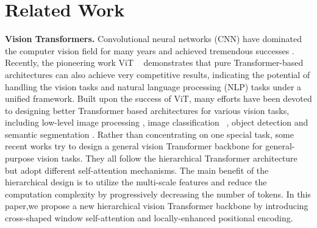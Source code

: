 \documentclass[10pt,twocolumn,letterpaper]{article}
\begin{document}
\section{Related Work}
\vspace{-1mm}
\noindent \textbf{Vision Transformers.} Convolutional neural networks (CNN) have dominated the computer vision field for many years and achieved tremendous successes \cite{krizhevsky2012imagenet, simonyan2014very, szegedy2015going,he2016deep,huang2017densely, chen2017dual, hu2018squeeze, tan2019efficientnet,howard2017mobilenets, sandler2018mobilenetv2, sun2019deep}. Recently, the pioneering work ViT ~\cite{dosovitskiy2020vit} demonstrates that pure Transformer-based architectures can also achieve very competitive results, indicating the potential of handling the vision tasks and natural language processing (NLP) tasks under a unified framework. Built upon the success of ViT,  many efforts have been devoted to designing better Transformer based architectures for various vision tasks, including low-level image processing \cite{chen2020pre,wan2021high}, image classification ~\cite{touvron2020deit, yuan2021tokens,xu2021coat,chu2021we,han2021tnt, wang2021pyramid,chu2021twins,wu2021cvt, chu2021twins, yuan2021incorporating, jiang2021token, touvron2021going, el2021training, he2021transreid},  object detection \cite{carion2020end,zhu2020deformable} and semantic segmentation \cite{wang2020end,zheng2020rethinking,strudel2021segmenter}. Rather than concentrating on one special task, some recent works \cite{wang2021pyramid,zhang2021mvit,liu2021swin} try to design a general vision Transformer backbone for general-purpose vision tasks. They all follow the hierarchical Transformer architecture but adopt different self-attention mechanisms. The main benefit of the hierarchical design is to utilize the multi-scale features and reduce the computation complexity by progressively decreasing the number of tokens.  In this paper,we propose a new hierarchical vision Transformer backbone by introducing cross-shaped window self-attention and locally-enhanced positional encoding. 
\end{document}
